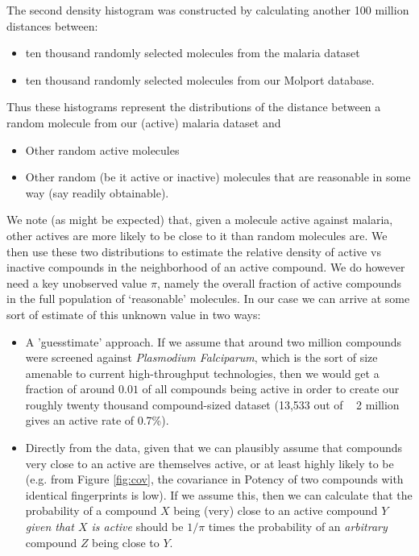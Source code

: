 \documentclass[journal=jacsat,manuscript=article]{achemso}
\begin{document}
The second density histogram was constructed by calculating another 100 million distances between:
\begin{itemize}
    \item ten thousand randomly selected molecules from the malaria dataset
    \item ten thousand randomly selected molecules from our Molport database.
\end{itemize}
Thus these histograms represent the distributions of the distance between a random molecule from our (active) malaria dataset and 
\begin{itemize}
    \item Other random active molecules
    \item Other random (be it active or inactive) molecules that are reasonable in some way (say readily obtainable).
\end{itemize}
We note (as might be expected) that, given a molecule active against malaria, other actives are more likely to be close to it than random molecules are.
\newline
\newline
We then use these two distributions to estimate the relative density of active vs inactive compounds in the neighborhood of an active compound.
We do however need a key unobserved value $\pi$, namely the overall fraction of active compounds in the full population of `reasonable' molecules.  In our case we can arrive at some sort of estimate of this unknown value in two ways:
\begin{itemize}
    \item A 'guesstimate' approach. If we assume that around two million compounds were screened against \textit{Plasmodium Falciparum}\cite{Gamo2010}, which is the sort of size amenable to current high-throughput technologies\cite{PaweSzymanskiMagdalenaMarkowicz2012,Gamo2010}, then we would get a fraction of around $0.01$ of all compounds being active in order to create our roughly twenty thousand compound-sized dataset (13,533 out of ~ 2 million gives an active rate of 0.7\%).
    \item Directly from the data, given that we can plausibly assume that compounds very close to an active are themselves active, or at least highly likely to be (e.g. from Figure \ref{fig:cov}, the covariance in Potency of two compounds with identical fingerprints is low).  If we assume this, then we can calculate that the probability of a compound $X$ being (very) close to an active compound $Y$ \textit{given that $X$ is active} should be $1/\pi$ times the probability of an \textit{arbitrary} compound $Z$ being close to $Y$.
\end{itemize}
\end{document}
